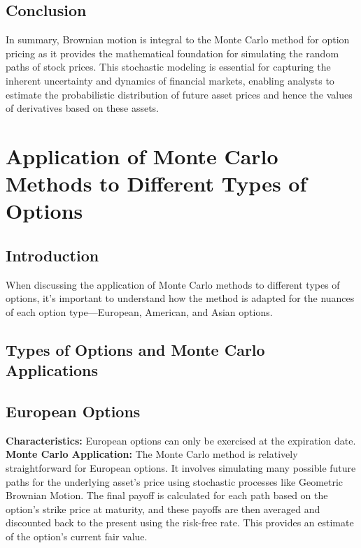 \documentclass{article}
\begin{document}
\subsection*{Conclusion}
In summary, Brownian motion is integral to the Monte Carlo method for option pricing as it provides the mathematical foundation for simulating the random paths of stock prices. This stochastic modeling is essential for capturing the inherent uncertainty and dynamics of financial markets, enabling analysts to estimate the probabilistic distribution of future asset prices and hence the values of derivatives based on these assets.

\newpage

\section{Application of Monte Carlo Methods to Different Types of Options}


\subsection*{Introduction}
When discussing the application of Monte Carlo methods to different types of options, it's important to understand how the method is adapted for the nuances of each option type—European, American, and Asian options.

\subsection*{Types of Options and Monte Carlo Applications}

\subsection{European Options}
\textbf{Characteristics:} European options can only be exercised at the expiration date.\\
\textbf{Monte Carlo Application:} The Monte Carlo method is relatively straightforward for European options. It involves simulating many possible future paths for the underlying asset's price using stochastic processes like Geometric Brownian Motion. The final payoff is calculated for each path based on the option's strike price at maturity, and these payoffs are then averaged and discounted back to the present using the risk-free rate. This provides an estimate of the option's current fair value.
\end{document}
